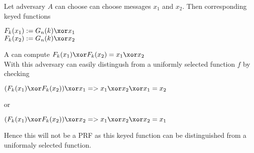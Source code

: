Let adversary $A$ can choose can choose messages $x_1$ and $x_2$. Then corresponding keyed functions 
\begin{center}
    $ F_k(x_1) := G_n(k) \xor x_1 $ \\
    $ F_k(x_2) := G_n(k) \xor x_2 $ \\
\end{center}

A can compute $ F_k(x_1) \xor F_k(x_2) =  x_1 \xor x_2 $ \\

With this adversary can easily distingush from a uniformly selected function $f$ by checking 

\begin{center}
    $ (F_k(x_1) \xor F_k(x_2) ) \xor x_1 => x_1 \xor x_2 \xor x_1  = x_2$
\end{center}

or 
\begin{center}
    $ (F_k(x_1) \xor F_k(x_2) ) \xor x_2 => x_1 \xor x_2 \xor x_2  = x_1$
\end{center}

Hence this will not be a PRF as this keyed function can be distinguished from a uniformaly selected function.









